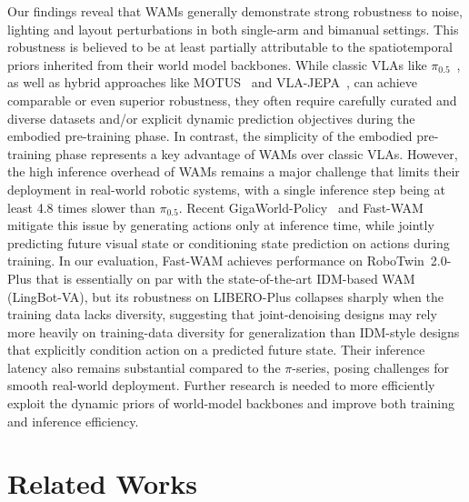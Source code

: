 \documentclass{article}
\begin{document}
Our findings reveal that WAMs generally demonstrate strong robustness to noise, lighting and layout perturbations in both single-arm and bimanual settings. This robustness is believed to be at least partially attributable to the spatiotemporal priors inherited from their world model backbones. While classic VLAs like $\pi_{0.5}$~\citep{pi05}, as well as hybrid approaches like MOTUS~\citep{bi2025motus} and VLA-JEPA~\citep{sun2026vla}, can achieve comparable or even superior robustness, they often require carefully curated and diverse datasets and/or explicit dynamic prediction objectives during the embodied pre-training phase. In contrast, the simplicity of the embodied pre-training phase represents a key advantage of WAMs over classic VLAs. However, the high inference overhead of WAMs remains a major challenge that limits their deployment in real-world robotic systems, with a single inference step being at least 4.8 times slower than $\pi_{0.5}$. Recent GigaWorld-Policy~\citep{ye2026gigaworld} and Fast-WAM~\citep{yuan2026fast} mitigate this issue by generating actions only at inference time, while jointly predicting future visual state or conditioning state prediction on actions during training. In our evaluation, Fast-WAM achieves performance on RoboTwin~2.0-Plus that is essentially on par with the state-of-the-art IDM-based WAM (LingBot-VA), but its robustness on LIBERO-Plus collapses sharply when the training data lacks diversity, suggesting that joint-denoising designs may rely more heavily on training-data diversity for generalization than IDM-style designs that explicitly condition action on a predicted future state. Their inference latency also remains substantial compared to the $\pi$-series, posing challenges for smooth real-world deployment. Further research is needed to more efficiently exploit the dynamic priors of world-model backbones and improve both training and inference efficiency.

\section{Related Works}
\end{document}
